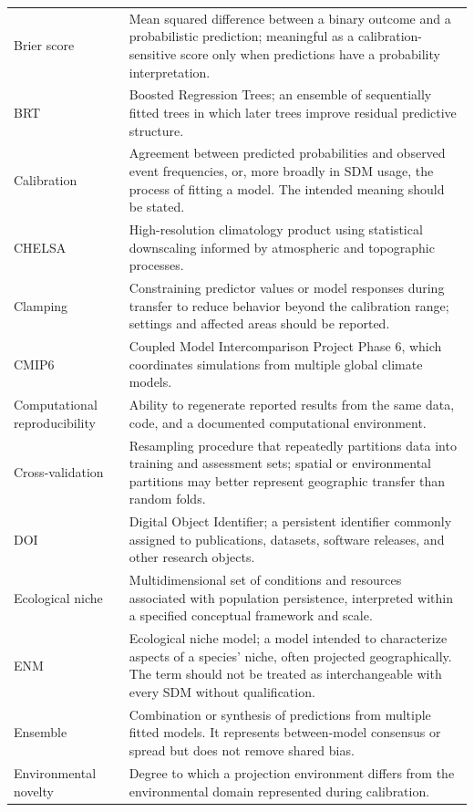\begin{longtable}{p{}p{}}
Brier score & Mean squared difference between a binary outcome and a probabilistic prediction; meaningful as a calibration-sensitive score only when predictions have a probability interpretation. \\
BRT & Boosted Regression Trees; an ensemble of sequentially fitted trees in which later trees improve residual predictive structure. \\
Calibration & Agreement between predicted probabilities and observed event frequencies, or, more broadly in SDM usage, the process of fitting a model. The intended meaning should be stated. \\
CHELSA & High-resolution climatology product using statistical downscaling informed by atmospheric and topographic processes. \\
Clamping & Constraining predictor values or model responses during transfer to reduce behavior beyond the calibration range; settings and affected areas should be reported. \\
CMIP6 & Coupled Model Intercomparison Project Phase 6, which coordinates simulations from multiple global climate models. \\
Computational reproducibility & Ability to regenerate reported results from the same data, code, and a documented computational environment. \\
Cross-validation & Resampling procedure that repeatedly partitions data into training and assessment sets; spatial or environmental partitions may better represent geographic transfer than random folds. \\
DOI & Digital Object Identifier; a persistent identifier commonly assigned to publications, datasets, software releases, and other research objects. \\
Ecological niche & Multidimensional set of conditions and resources associated with population persistence, interpreted within a specified conceptual framework and scale. \\
ENM & Ecological niche model; a model intended to characterize aspects of a species' niche, often projected geographically. The term should not be treated as interchangeable with every SDM without qualification. \\
Ensemble & Combination or synthesis of predictions from multiple fitted models. It represents between-model consensus or spread but does not remove shared bias. \\
Environmental novelty & Degree to which a projection environment differs from the environmental domain represented during calibration. \\

\end{longtable}
